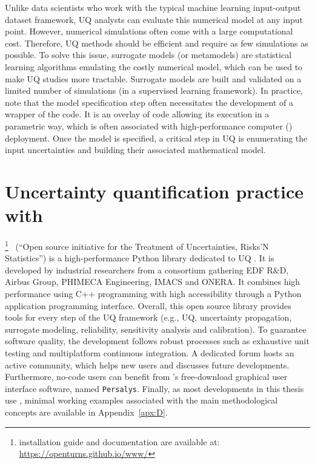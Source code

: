Unlike data scientists who work with the typical machine learning input-output dataset framework, UQ analysts can evaluate this numerical model at any input point. 
However, numerical simulations often come with a large computational cost. 
Therefore, UQ methods should be efficient and require as few simulations as possible. 
To solve this issue, surrogate models (or metamodels) are statistical learning algorithms emulating the costly numerical model, which can be used to make UQ studies more tractable. 
Surrogate models are built and validated on a limited number of simulations (in a supervised learning framework). 
In practice, note that the model specification step often necessitates the development of a wrapper of the code. 
It is an overlay of code allowing its execution in a parametric way, which is often associated with high-performance computer () deployment.  
Once the model is specified, a critical step in UQ is enumerating the input uncertainties and building their associated mathematical model.


\section{Uncertainty quantification practice with \ot}
\ot\footnote{{\ots installation guide and documentation are available at: \url{https://openturns.github.io/www/}}}~ (``Open source initiative for the Treatment of Uncertainties, Risks’N Statistics'') is a high-performance Python library dedicated to UQ \citep{baudin_dutfoy_2017}. 
It is developed by industrial researchers from a consortium gathering EDF R\&D, Airbus Group, PHIMECA Engineering, IMACS and ONERA. 
It combines high performance using C++ programming with high accessibility through a Python application programming interface. 
Overall, this open source library provides tools for every step of the UQ framework (e.g., UQ, uncertainty propagation, surrogate modeling, reliability, sensitivity analysis and calibration). 
To guarantee software quality, the development follows robust processes such as exhaustive unit testing and multiplatform continuous integration. 
A dedicated forum hosts an active community, which helps new users and discusses future developments. 
Furthermore, no-code users can benefit from \texttt{}'s free-download graphical user interface software, named \texttt{Persalys}\footnotemark. 
Finally, as most developments in this thesis use \ot, minimal working examples associated with the main methodological concepts are available in Appendix~\ref{apx:D}.  

